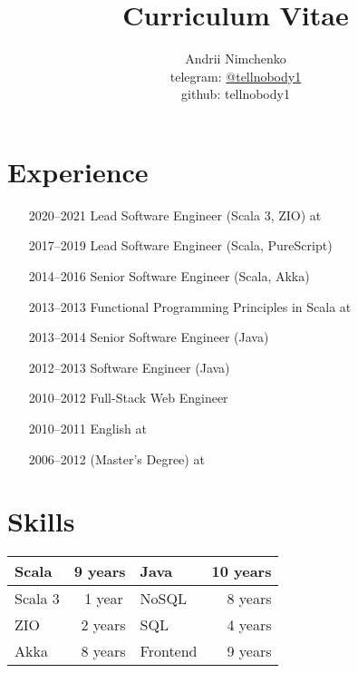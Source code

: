 

\title{Curriculum Vitae}
\author{
  Andrii Nimchenko\\
  telegram: \href{https://t.me/tellnobody1}{@tellnobody1}\\
  github: tellnobody1
}
\maketitle

\section{Experience}
\begin{itemize}
  \item[2020–2021] Lead Software Engineer (Scala 3, ZIO) at 
  \item[2017–2019] Lead Software Engineer (Scala, PureScript)
  \item[2014–2016] Senior Software Engineer (Scala, Akka)
  \item[2013–2013] Functional Programming Principles in Scala at 
  \item[2013–2014] Senior Software Engineer (Java)
  \item[2012–2013] Software Engineer (Java)
  \item[2010–2012] Full-Stack Web Engineer
  \item[2010–2011] English  at 
  \item[2006–2012]  (Master's Degree) at 
\end{itemize}

\section{Skills}
\begin{table}[H]
  \begin{tabular}{lr||lr}
  Scala   &  9 years    & Java     & 10 years \\ \hline
  Scala 3 &  1 year\:\, & NoSQL    &  8 years \\ \hline
  ZIO     &  2 years    & SQL      &  4 years \\ \hline
  Akka    &  8 years    & Frontend &  9 years
  \end{tabular}
\end{table}

